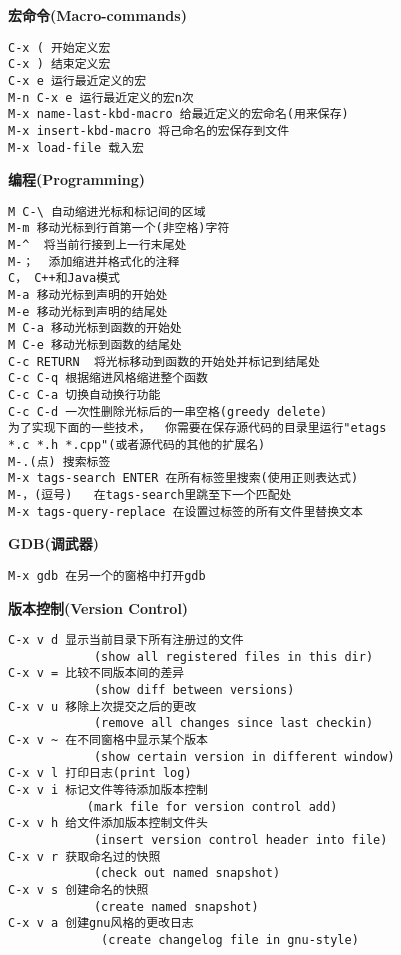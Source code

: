 \documentclass{article}
\newcommand{\xiaosi}{\fontsize{12pt}{18pt}\selectfont}            %
\begin{document}
\begin{multicols}{2}
\begin{verbatim}
\end{verbatim}
\vspace{-9pt}
\noindent \textbf{\xiaosi 宏命令(Macro-commands)}
\vspace{-9pt}
\begin{verbatim}
C-x ( 开始定义宏
C-x ) 结束定义宏
C-x e 运行最近定义的宏
M-n C-x e 运行最近定义的宏n次
M-x name-last-kbd-macro 给最近定义的宏命名(用来保存)
M-x insert-kbd-macro 将己命名的宏保存到文件
M-x load-file 载入宏
\end{verbatim}
\vspace{-9pt}
\noindent \textbf{\xiaosi 编程(Programming)}
\vspace{-9pt}
\begin{verbatim}
M C-\ 自动缩进光标和标记间的区域
M-m 移动光标到行首第一个(非空格)字符
M-^  将当前行接到上一行末尾处
M-；  添加缩进并格式化的注释
C， C++和Java模式
M-a 移动光标到声明的开始处
M-e 移动光标到声明的结尾处
M C-a 移动光标到函数的开始处
M C-e 移动光标到函数的结尾处
C-c RETURN  将光标移动到函数的开始处并标记到结尾处
C-c C-q 根据缩进风格缩进整个函数
C-c C-a 切换自动换行功能
C-c C-d 一次性删除光标后的一串空格(greedy delete)
为了实现下面的一些技术，  你需要在保存源代码的目录里运行"etags
*.c *.h *.cpp"(或者源代码的其他的扩展名) 
M-.(点) 搜索标签
M-x tags-search ENTER 在所有标签里搜索(使用正则表达式)
M-，(逗号)   在tags-search里跳至下一个匹配处
M-x tags-query-replace 在设置过标签的所有文件里替换文本
\end{verbatim}
\vspace{-9pt}
\noindent \textbf{\xiaosi GDB(调武器)}
\vspace{-9pt}
\begin{verbatim}
M-x gdb 在另一个的窗格中打开gdb
\end{verbatim}
\vspace{-9pt}
\noindent \textbf{\xiaosi 版本控制(Version Control)}
\vspace{-9pt}
\begin{verbatim}
C-x v d 显示当前目录下所有注册过的文件
            (show all registered files in this dir) 
C-x v = 比较不同版本间的差异
            (show diff between versions)
C-x v u 移除上次提交之后的更改
            (remove all changes since last checkin)
C-x v ~ 在不同窗格中显示某个版本
            (show certain version in different window) 
C-x v l 打印日志(print log)
C-x v i 标记文件等待添加版本控制
           (mark file for version control add)
C-x v h 给文件添加版本控制文件头
            (insert version control header into file) 
C-x v r 获取命名过的快照
            (check out named snapshot)
C-x v s 创建命名的快照
            (create named snapshot)
C-x v a 创建gnu风格的更改日志
             (create changelog file in gnu-style)
\end{verbatim}
\end{multicols}
\end{document}
